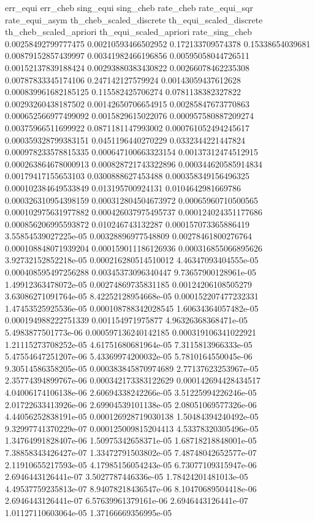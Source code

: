 err_equi	err_cheb	sing_equi	sing_cheb	rate_cheb	rate_equi_sqr	rate_equi_asym	th_cheb_scaled_discrete	th_equi_scaled_discrete	th_cheb_scaled_apriori	th_equi_scaled_apriori	rate_sing_cheb
0.00258492799777475	0.00210593466502952	0.172133709574378	0.15338654039681	0.00879152857439997	0.00341982466196856	0.00595058044726511	0.00152137839188424	0.00293880383430822	0.00266078462235308	0.00787833345174106	0.247142127579924
0.00143059437612628	0.000839961682185125	0.115582425706274	0.0781138382327822	0.00293260438187502	0.00142650706654915	0.00285847673770863	0.000652566977499092	0.0015829615022076	0.000957580887209274	0.00375966511699922	0.0871181147993002
0.000761052494245617	0.000359328799383151	0.0451196440270229	0.0332344221447824	0.000978233578815335	0.000647100663323154	0.00137312474512915	0.000263864678000913	0.000828721743322896	0.000344620585914834	0.00179417155653103	0.0300888627453488
0.000358349156496325	0.000102384649533849	0.013195700924131	0.0104642981669786	0.000326310954398159	0.000312804504673972	0.00065960710500565	0.000102975631977882	0.000426037975495737	0.000124024351177686	0.000856206995593872	0.010246743132287
0.000157073365886419	3.55854539027225e-05	0.00328896977548809	0.00278461800276764	0.000108848071939204	0.000159011186126936	0.000316855066895626	3.92732152852218e-05	0.000216280514510012	4.46347093404555e-05	0.000408595497256288	0.00345373096340447
9.73657900128961e-05	1.49912363478072e-05	0.00274869735831185	0.00124206108505279	3.63086271091764e-05	8.42252128954668e-05	0.000152207477232331	1.47453525925536e-05	0.000108788342028545	1.60634364057482e-05	0.000194988222751339	0.001154971975877
4.96326368368471e-05	5.4983877501773e-06	0.000597136240142185	0.000319106341022921	1.21115273708252e-05	4.61751680681964e-05	7.3115813966333e-05	5.47554647251207e-06	5.43369974200032e-05	5.7810164550045e-06	9.30514586358205e-05	0.000383845870974689
2.77137623253967e-05	2.35774394899767e-06	0.000342173383122629	0.000142694428434517	4.04006174106138e-06	2.60694338242266e-05	3.51225994226246e-05	2.01722633413926e-06	2.69904539101138e-05	2.08051069577326e-06	4.44056252838191e-05	0.000126928719030138
1.50484394240492e-05	9.32997741370229e-07	0.000125009815204413	4.53378320305496e-05	1.34764991828407e-06	1.50975342658371e-05	1.68718218848001e-05	7.38858343426427e-07	1.33472791503802e-05	7.48748042652577e-07	2.11910655217593e-05	4.17985156054243e-05
6.73077109315947e-06	2.6946443126441e-07	3.5027787446336e-05	1.78424201481013e-05	4.49537759235813e-07	8.94078218436547e-06	8.10470689504418e-06	2.6946443126441e-07	6.57639961379161e-06	2.6946443126441e-07	1.01127110603064e-05	1.37166669356995e-05

